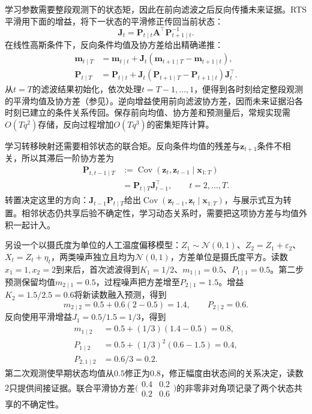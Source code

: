 学习参数需要整段观测下的状态矩，因此在前向滤波之后反向传播未来证据。RTS平滑用下面的增益，将下一状态的平滑修正传回当前状态：
\[
  \bm{J}_t=\bm{P}_{t\mid t}\bm{A}^{\top}
    \bm{P}_{t+1\mid t}^{-1}.
\]
在线性高斯条件下，反向条件均值及协方差给出精确递推：
\begin{equation}
  \begin{aligned}
    \bm{m}_{t\mid T}
      &=\bm{m}_{t\mid t}
        +\bm{J}_t(\bm{m}_{t+1\mid T}
          -\bm{m}_{t+1\mid t}),\\
    \bm{P}_{t\mid T}
      &=\bm{P}_{t\mid t}
        +\bm{J}_t(\bm{P}_{t+1\mid T}
          -\bm{P}_{t+1\mid t})\bm{J}_t^\top.
  \end{aligned}
  \label{eq:pgm-dynamic-rts}
\end{equation}
从$t=T$的滤波结果初始化，依次处理$t=T-1,\ldots,1$，便得到各时刻给定整段观测的平滑均值及协方差（参见）。逆向增益使用前向滤波协方差，因而未来证据沿各时刻已建立的条件关系传回。保存前向均值、协方差和预测量后，常规实现需$O(Tq^2)$存储，反向过程增加$O(Tq^3)$的密集矩阵计算。

学习转移映射还需要相邻状态的联合矩。反向条件均值的残差与$\bm{z}_{t+1}$条件不相关，所以其滞后一阶协方差为
\begin{equation}
  \begin{aligned}
    \bm{P}_{t,t-1\mid T}
      &:=\operatorname{Cov}(\bm{z}_t,\bm{z}_{t-1}
        \mid\bm{x}_{1:T})\\
      &=\bm{P}_{t\mid T}\bm{J}_{t-1}^{\top},
      \qquad t=2,\ldots,T.
  \end{aligned}
  \label{eq:pgm-dynamic-lag-covariance}
\end{equation}
转置决定这里的方向：$\bm{J}_{t-1}\bm{P}_{t\mid T}$给出$\operatorname{Cov}(\bm{z}_{t-1},\bm{z}_{t}\mid\bm{x}_{1:T})$，与展示式互为转置。相邻状态仍共享后验不确定性，学习动态关系时，需要把这项协方差与均值外积一起计入。

\begin{example}
  \label{ex:pgm-dynamic-kalman}
  另设一个以摄氏度为单位的人工温度偏移模型：$Z_1\sim\mathcal{N}(0,1)$、$Z_2=Z_1+\varepsilon_2$、$X_t=Z_t+\eta_t$，两类噪声独立且均为$\mathcal{N}(0,1)$，方差单位是摄氏度平方。读数$x_1=1,x_2=2$到来后，首次滤波得到$K_1=1/2$、$m_{1\mid1}=0.5$、$P_{1\mid1}=0.5$。第二步预测保留均值$m_{2\mid1}=0.5$，过程噪声把方差增至$P_{2\mid1}=1.5$。增益$K_2=1.5/2.5=0.6$将新读数融入预测，得到
  \[
    m_{2\mid2}=0.5+0.6(2-0.5)=1.4,\qquad
    P_{2\mid2}=0.6.
  \]
  反向使用平滑增益$J_1=0.5/1.5=1/3$，得到
  \[
    \begin{aligned}
      m_{1\mid2}&=0.5+(1/3)(1.4-0.5)=0.8,\\
      P_{1\mid2}&=0.5+(1/3)^2(0.6-1.5)=0.4,\\
      P_{2,1\mid2}&=0.6/3=0.2.
    \end{aligned}
  \]
  第二次观测使早期状态均值从$0.5$修正为$0.8$，修正幅度由状态间的关系决定，读数$2$只提供间接证据。联合平滑协方差$\bigl(\begin{smallmatrix}0.4&0.2\\0.2&0.6\end{smallmatrix}\bigr)$的非零非对角项记录了两个状态共享的不确定性。
\end{example}

